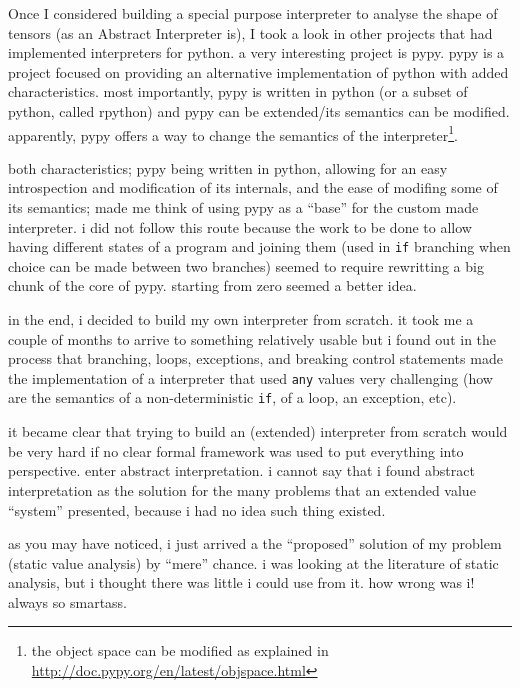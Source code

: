 {}

Once I considered building a special purpose interpreter to analyse the
shape of tensors (as an Abstract Interpreter is), I took a look in other
projects that had implemented interpreters for python. a very
interesting project is pypy. pypy \autocite{krekel_pypy_2007} is a
project focused on providing an alternative implementation of python
with added characteristics. most importantly, pypy is written in python
(or a subset of python, called rpython) and pypy can be extended/its
semantics can be modified. apparently, pypy offers a way to change the
semantics of the interpreter\footnote{the object space can be modified
  as explained in \url{http://doc.pypy.org/en/latest/objspace.html}}.

both characteristics; pypy being written in python, allowing for an easy
introspection and modification of its internals, and the ease of
modifing some of its semantics; made me think of using pypy as a
\enquote{base} for the custom made interpreter. i did not follow this
route because the work to be done to allow having different states of a
program and joining them (used in \texttt{if} branching when choice can
be made between two branches) seemed to require rewritting a big chunk
of the core of pypy. starting from zero seemed a better idea.

{}

in the end, i decided to build my own interpreter from scratch. it took
me a couple of months to arrive to something relatively usable but i
found out in the process that branching, loops, exceptions, and breaking
control statements made the implementation of a interpreter that used
\texttt{any} values very challenging (how are the semantics of a
non-deterministic \texttt{if}, of a loop, an exception, etc).

it became clear that trying to build an (extended) interpreter from
scratch would be very hard if no clear formal framework was used to put
everything into perspective. enter abstract interpretation. i cannot say
that i found abstract interpretation as the solution for the many
problems that an extended value \enquote{system} presented, because i
had no idea such thing existed.

as you may have noticed, i just arrived a the \enquote{proposed}
solution of my problem (static value analysis) by \enquote{mere} chance.
i was looking at the literature of static analysis, but i thought there
was little i could use from it. how wrong was i! always so
smartass{}.

